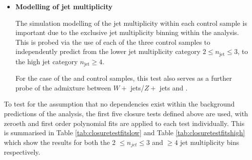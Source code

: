 \begin{itemize}
\item[]\textbf{Modelling of jet multiplicity}

The simulation modelling of the jet multiplicity within each control sample is important due to the exclusive jet multiplicity binning within the analysis. This is probed via the use of each of the three control samples to independently predict from the lower jet multiplicity category $2 \leq n_{\text{jet}} \leq 3$, to the high jet category $n_{\text{jet}} \geq 4$. 

For the case of the \mupjets and \dimupjets control samples, this test also serves as a further probe of the admixture between $W +$ jets/$Z +$ jets and \ttbar. 
\end{itemize}

To test for the assumption that no \theht dependencies exist within the background predictions of the analysis, the first five closure tests defined above are used, with zeroeth and first order polynomial fits are applied to each test individually. This is summarised in Table \ref{tab:closuretestfitslow} and Table \ref{tab:closuretestfitshigh} which show the results for both the 2 $\leq n_{jet} \leq 3$ and $\geq 4$ jet multiplicity bins respectively.

